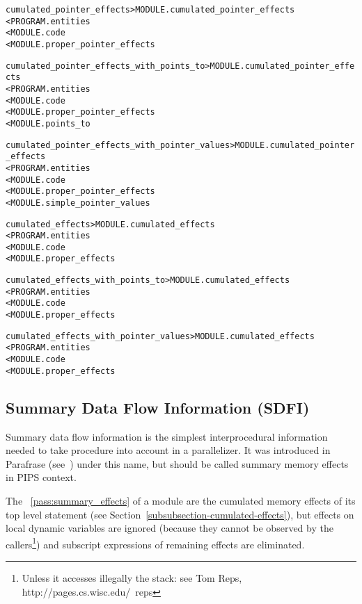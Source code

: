 \documentclass[a4paper]{report}
\newenvironment{PipsMake}{\begin{alltt}}{\end{alltt}}
\newcommand{\PipsPassRef}[1]{\texttt{\detokenize{#1}}~\ref{pass:#1}}
\newenvironment{PipsPass}[1]{\label{pass:#1}}{}
\begin{document}
\begin{PipsMake}
cumulated_pointer_effects   > MODULE.cumulated_pointer_effects
        < PROGRAM.entities
        < MODULE.code
        < MODULE.proper_pointer_effects
\end{PipsMake}

\begin{PipsMake}
cumulated_pointer_effects_with_points_to > MODULE.cumulated_pointer_effects
        < PROGRAM.entities
        < MODULE.code
        < MODULE.proper_pointer_effects
        < MODULE.points_to
\end{PipsMake}

\begin{PipsMake}
cumulated_pointer_effects_with_pointer_values > MODULE.cumulated_pointer_effects
        < PROGRAM.entities
        < MODULE.code
        < MODULE.proper_pointer_effects
        < MODULE.simple_pointer_values
\end{PipsMake}

\begin{PipsMake}
cumulated_effects            > MODULE.cumulated_effects
        < PROGRAM.entities
        < MODULE.code
        < MODULE.proper_effects
\end{PipsMake}

\begin{PipsMake}
cumulated_effects_with_points_to        > MODULE.cumulated_effects
        < PROGRAM.entities
        < MODULE.code
        < MODULE.proper_effects
\end{PipsMake}

\begin{PipsMake}
cumulated_effects_with_pointer_values   > MODULE.cumulated_effects
        < PROGRAM.entities
        < MODULE.code
        < MODULE.proper_effects
\end{PipsMake}

\subsection{Summary Data Flow Information (SDFI)}
\label{subsubection-summary-data-flow-information}

Summary data flow information is the simplest interprocedural
information needed to take procedure into account in a
parallelizer. It was introduced in Parafrase (see~\cite{LY88c}) under
this name, but should be called summary memory effects in PIPS context.

\begin{PipsPass}{summary_effects}
The \PipsPassRef{summary_effects} of a module are the cumulated memory
effects of its
top level statement (see Section~\ref{subsubsection-cumulated-effects}), but effects on local dynamic variables are
ignored (because they cannot be observed by the callers\footnote{Unless
it accesses illegally the stack: see Tom Reps,
http://pages.cs.wisc.edu/~reps}) and subscript expressions of remaining
effects are eliminated.
\end{PipsPass}
\end{document}
